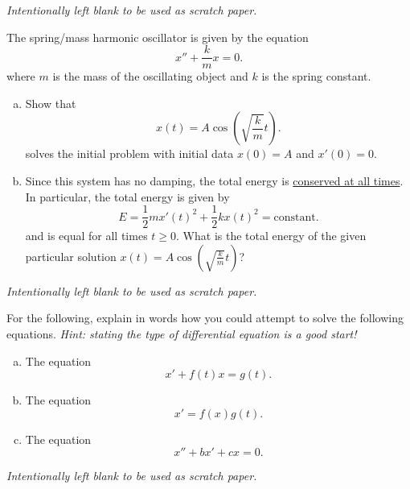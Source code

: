\documentclass[12pt]{amsbook}
\begin{document}
\newpage
\emph{Intentionally left blank to be used as scratch paper.}\\


\newpage
\begin{problem}
The spring/mass harmonic oscillator is given by the equation
\[
x''+ \frac{k}{m}x = 0.
\]
where $m$ is the mass of the oscillating object and $k$ is the spring constant.
\begin{enumerate}[(a)]
    \item Show that
    \[
    x(t)=A \cos\left(\sqrt{\frac{k}{m}}t\right).
    \]
    solves the initial problem with initial data $x(0)=A$ and $x'(0)=0$.
    \vspace*{6cm}
    \item Since this system has no damping, the total energy is \underline{conserved at all times}.  In particular, the total energy is given by
    \[
    E=\frac{1}{2}mx'(t)^2+\frac{1}{2}kx(t)^2 = \textrm{constant}.
    \]
    and is equal for all times $t\geq 0$. What is the total energy of the given particular solution $x(t)=A\cos\left(\sqrt{\frac{k}{m}}t\right)$?
    \vspace*{5cm}
    
\end{enumerate}
\end{problem}

\newpage
\emph{Intentionally left blank to be used as scratch paper.}\\


\newpage
\begin{problem} For the following, explain in words how you could attempt to solve the following equations.  \emph{Hint: stating the type of differential equation is a good start!}
\begin{enumerate}[(a)]
    \item The equation
    \[
    x'+f(t)x=g(t).
    \]
    \vspace*{5.5cm}
    \item The equation 
    \[
    x'=f(x)g(t).
    \]
    \vspace*{5.5cm}
    \item The equation
    \[
    x''+bx'+cx=0.
    \]
\end{enumerate}
\end{problem}

\newpage
\emph{Intentionally left blank to be used as scratch paper.}\\
\end{document}
